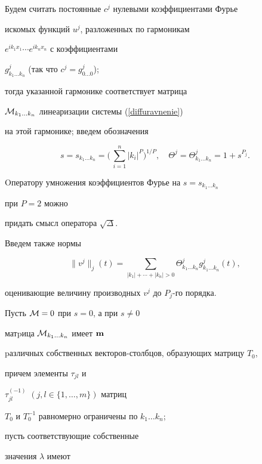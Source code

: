 Будем считать постоянные $c^j$ нулевыми коэффициентами Фурье


искомых функций $u^j$, разложенных по гармоникам


$e^{ik_1x_1}\dotsb e^{ik_nx_n}$ с коэффициентами


$g_{k_1\dotsc k_n}^j$ (так что $c^j=g_{0\dotsc0}^j$);


тогда указанной гармонике соответствует матрица


${\cal{M}}_{k_1\dotsc k_n}$ линеаризации системы (\ref{diffuravnenie})


на этой гармонике; введем обозначения


$$


\label{sP}


s=s_{k_1\dotsc k_n}=\bigg(\,\sum_{i=1}^{n}|k_i|^P\bigg)^{1/P},\quad


\Theta^j=\Theta^j_{k_1\dotsc k_n}=1+s^{P_j}.


$$


Oператору умножения коэффициентов Фурье на $s=s_{k_1\dotsc k_n}$


при $P=2$ можно


придать смысл оператора $\sqrt{\Delta}$.


Введем также нормы


\begin{equation}


\label{normu}


\|v^j\|_j(t)=\sum_{|k_1|+\dotsb+|k_n|>0}


\Theta^j_{k_1\dotsc k_n}g_{k_1\dotsc k_n}^j(t),


\end{equation}


оценивающие величину производных $v^j$ до $P_j$-го порядка.





Пусть ${\cal{M}}=0$ при $s=0$, а при $s\neq0$


матpица ${\cal{M}}_{k_1\dotsc k_n}$ имеет $\bold m$


pазличных собственных векторов-столбцов, образующих матрицу $T_0$,


причем элементы $\tau_{jl}$ и


$\tau_{jl}^{(-1)}$ $(j,l\in\{1,\dotsc,m\})$ матриц


$T_0$ и $T_0^{-1}$ равномерно ограничены по ${k_1\dotsc k_n}$;


пусть соответствующие собственные


значения $ \lambda$ имеют


